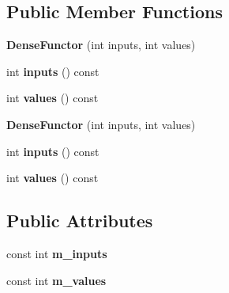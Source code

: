\subsection*{Public Member Functions}
\begin{DoxyCompactItemize}
\item 
\mbox{\label{struct_eigen_1_1_dense_functor_ae73ca67051cf4f2f122b94c73a655ab0}} 
{\bfseries Dense\+Functor} (int inputs, int values)
\item 
\mbox{\label{struct_eigen_1_1_dense_functor_a3c626c07d04c37694defc84b37685c31}} 
int {\bfseries inputs} () const
\item 
\mbox{\label{struct_eigen_1_1_dense_functor_aec9ab249752ab792cba7d202295e786d}} 
int {\bfseries values} () const
\item 
\mbox{\label{struct_eigen_1_1_dense_functor_ae73ca67051cf4f2f122b94c73a655ab0}} 
{\bfseries Dense\+Functor} (int inputs, int values)
\item 
\mbox{\label{struct_eigen_1_1_dense_functor_a3c626c07d04c37694defc84b37685c31}} 
int {\bfseries inputs} () const
\item 
\mbox{\label{struct_eigen_1_1_dense_functor_aec9ab249752ab792cba7d202295e786d}} 
int {\bfseries values} () const
\end{DoxyCompactItemize}
\subsection*{Public Attributes}
\begin{DoxyCompactItemize}
\item 
\mbox{\label{struct_eigen_1_1_dense_functor_acf08dd16217cd76f88d6d0c019358fc3}} 
const int {\bfseries m\+\_\+inputs}
\item 
\mbox{\label{struct_eigen_1_1_dense_functor_a0d9b575cb383735f1b0349e98a8dd429}} 
const int {\bfseries m\+\_\+values}
\end{DoxyCompactItemize}



